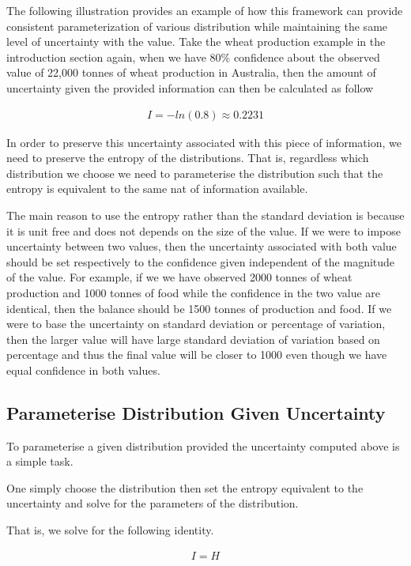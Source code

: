 \documentclass[nojss]{jss}\usepackage[]{graphicx}\usepackage[]{color}
\begin{document}
The following illustration provides an example of how this framework
can provide consistent parameterization of various distribution while
maintaining the same level of uncertainty with the value. Take the
wheat production example in the introduction section again, when we
have 80\% confidence about the observed value of 22,000 tonnes of
wheat production in Australia, then the amount of uncertainty given
the provided information can then be calculated as follow

\begin{align}
  I = -ln(0.8) \approx 0.2231
\end{align}

In order to preserve this uncertainty associated with this piece of
information, we need to preserve the entropy of the
distributions. That is, regardless which distribution we choose we
need to parameterise the distribution such that the entropy is
equivalent to the same nat of information available.

The main reason to use the entropy rather than the standard deviation
is because it is unit free and does not depends on the size of the
value. If we were to impose uncertainty between two values, then the
uncertainty associated with both value should be set respectively to
the confidence given independent of the magnitude of the value. For
example, if we we have observed 2000 tonnes of wheat production and
1000 tonnes of food while the confidence in the two value are
identical, then the balance should be 1500 tonnes of production and
food. If we were to base the uncertainty on standard deviation or
percentage of variation, then the larger value will have large
standard deviation of variation based on percentage and thus the final
value will be closer to 1000 even though we have equal confidence in
both values.

\subsection{Parameterise Distribution Given Uncertainty}

To parameterise a given distribution provided the uncertainty computed
above is a simple task.

One simply choose the distribution then set the entropy equivalent to
the uncertainty and solve for the parameters of the distribution.

That is, we solve for the following identity.

\begin{align}
  I = H
\end{align}
\end{document}
